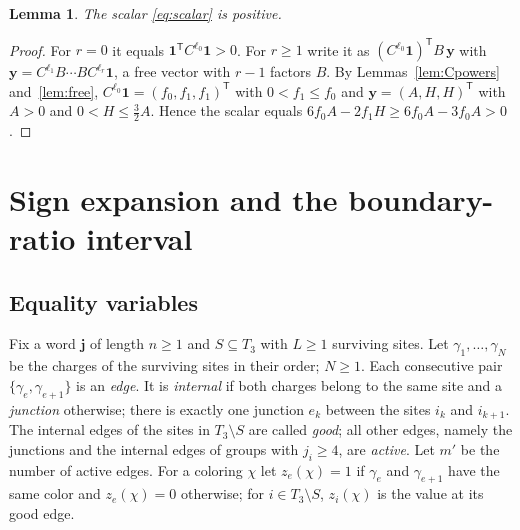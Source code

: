 \documentclass{amsart}
\newtheorem{lemma}[theorem]{Lemma}
\theoremstyle{definition}
\theoremstyle{remark}
\numberwithin{equation}{section}
\newcommand{\one}{\mathbf{1}}
\newcommand{\jj}{\mathbf{j}}
\begin{document}
\begin{lemma}\label{lem:scalar}
The scalar \eqref{eq:scalar} is positive.
\end{lemma}

\begin{proof}
For $r=0$ it equals $\one^{\mathsf T}C^{\ell_0}\one>0$. For $r\ge1$ write it as $(C^{\ell_0}\one)^{\mathsf T}B\,\mathbf y$ with $\mathbf y=C^{\ell_1}B\cdots BC^{\ell_r}\one$, a free vector with $r-1$ factors $B$. By Lemmas~\ref{lem:Cpowers} and~\ref{lem:free}, $C^{\ell_0}\one=(f_0,f_1,f_1)^{\mathsf T}$ with $0<f_1\le f_0$ and $\mathbf y=(A,H,H)^{\mathsf T}$ with $A>0$ and $0<H\le\frac32A$. Hence the scalar equals $6f_0A-2f_1H\ge6f_0A-3f_0A>0$.
\end{proof}

\section{Sign expansion and the boundary-ratio interval}\label{sec:signs}

\subsection{Equality variables}
Fix a word $\jj$ of length $n\ge1$ and $S\subseteq T_3$ with $L\ge1$ surviving sites. Let $\gamma_1,\dots,\gamma_N$ be the charges of the surviving sites in their order; $N\ge1$. Each consecutive pair $\{\gamma_e,\gamma_{e+1}\}$ is an \emph{edge}. It is \emph{internal} if both charges belong to the same site and a \emph{junction} otherwise; there is exactly one junction $e_k$ between the sites $i_k$ and $i_{k+1}$. The internal edges of the sites in $T_3\setminus S$ are called \emph{good}; all other edges, namely the junctions and the internal edges of groups with $j_i\ge4$, are \emph{active}. Let $m'$ be the number of active edges. For a coloring $\chi$ let $z_e(\chi)=1$ if $\gamma_e$ and $\gamma_{e+1}$ have the same color and $z_e(\chi)=0$ otherwise; for $i\in T_3\setminus S$, $z_i(\chi)$ is the value at its good edge.
\end{document}
